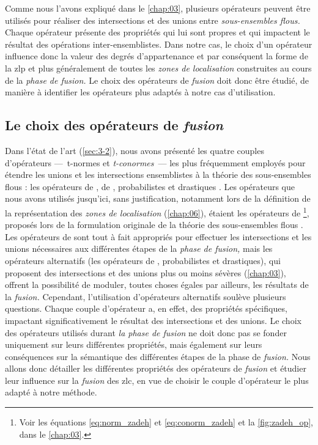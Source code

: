 Comme nous l'avons expliqué dans le \autoref{chap:03}, plusieurs
opérateurs peuvent être utilisés pour réaliser des intersections et
des unions entre \emph{sous-ensembles flous.} Chaque opérateur
présente des propriétés qui lui sont propres et qui impactent le
résultat des opérations inter-ensemblistes. Dans notre cas, le choix
d'un opérateur influence donc la valeur des degrés d'appartenance et
par conséquent la forme de la \ac{zlp} et plus généralement de toutes
les \emph{zones de localisation} construites au cours de la
\emph{phase de fusion.} Le choix des opérateurs de \emph{fusion} doit
donc être étudié, de manière à identifier les opérateurs plus adaptés
à notre cas d'utilisation.

\subsection{Le choix des opérateurs de \emph{fusion}}

Dans l'état de l'art (\autoref{sec:3-2}), nous avons présenté les
quatre couples d'opérateurs ---~t-normes et \emph{t-conormes}~--- les
plus fréquemment employés pour étendre les unions et les intersections
ensemblistes à la théorie des sous-ensembles flous : les opérateurs de
, de , probabilistes et drastiques
\autocite{Klir1995}. Les opérateurs que nous avons utilisés jusqu'ici,
sans justification, notamment lors de la définition de la
représentation des \emph{zones de localisation} (\autoref{chap:06}),
étaient les opérateurs de  \footnote{Voir les équations
  \ref{eq:norm_zadeh} et \ref{eq:conorm_zadeh} et la
  \autoref{fig:zadeh_op}, dans le \autoref{chap:03}.}, proposés lors
de la formulation originale de la théorie des sous-ensembles flous
\autocite{Zadeh1965}. Les opérateurs de  sont tout à fait
appropriés pour effectuer les intersections et les unions nécessaires
aux différentes étapes de la \emph{phase de fusion,} mais les
opérateurs alternatifs (\ie les opérateurs de ,
probabilistes et drastiques), qui proposent des intersections et des
unions plus ou moins sévères (\autoref{chap:03}), offrent la
possibilité de moduler, toutes choses égales par ailleurs, les
résultats de la \emph{fusion.} Cependant, l'utilisation d'opérateurs
alternatifs soulève plusieurs questions. Chaque couple d'opérateur a,
en effet, des propriétés spécifiques, impactant significativement le
résultat des intersections et des unions. Le choix des opérateurs
utilisés durant \emph{la phase de fusion} ne doit donc pas se fonder
uniquement sur leurs différentes propriétés, mais également sur leurs
conséquences sur la sémantique des différentes étapes de la phase de
\emph{fusion.}  Nous allons donc détailler les différentes propriétés
des opérateurs de \emph{fusion} et étudier leur influence sur la
\emph{fusion} des \ac{zlc}, en vue de choisir le couple d'opérateur le
plus adapté à notre méthode.

